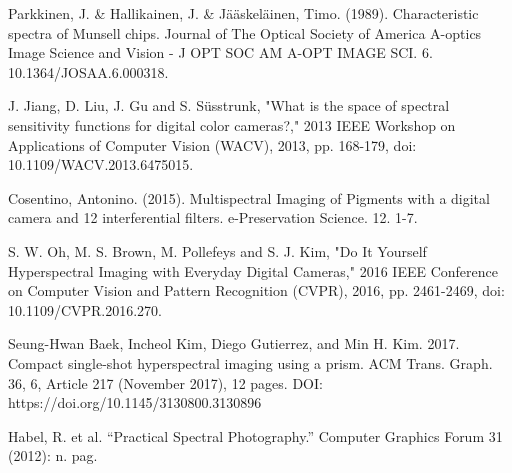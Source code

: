 \documentclass[twocolumn,10pt]{asme2ej}
\begin{document}
\clearpage

 \begin{thebibliography}{12}

 {Parkkinen, J. \& Hallikainen, J. \& Jääskeläinen, Timo. (1989). Characteristic spectra of Munsell chips. Journal of The Optical Society of America A-optics Image Science and Vision - J OPT SOC AM A-OPT IMAGE SCI. 6. 10.1364/JOSAA.6.000318.}
 
{J. Jiang, D. Liu, J. Gu and S. Süsstrunk, "What is the space of spectral sensitivity functions for digital color cameras?," 2013 IEEE Workshop on Applications of Computer Vision (WACV), 2013, pp. 168-179, doi: 10.1109/WACV.2013.6475015.}

{Cosentino, Antonino. (2015). Multispectral Imaging of Pigments with a digital camera and 12 interferential filters. e-Preservation Science. 12. 1-7.}

{S. W. Oh, M. S. Brown, M. Pollefeys and S. J. Kim, "Do It Yourself Hyperspectral Imaging with Everyday Digital Cameras," 2016 IEEE Conference on Computer Vision and Pattern Recognition (CVPR), 2016, pp. 2461-2469, doi: 10.1109/CVPR.2016.270.}

{Seung-Hwan Baek, Incheol Kim, Diego Gutierrez, and Min H. Kim. 2017. Compact single-shot hyperspectral imaging using a prism. ACM Trans. Graph. 36, 6, Article 217 (November 2017), 12 pages. DOI: https://doi.org/10.1145/3130800.3130896}

{Habel, R. et al. “Practical Spectral Photography.” Computer Graphics Forum 31 (2012): n. pag.}

 \end{thebibliography}
 
 
\end{document}
